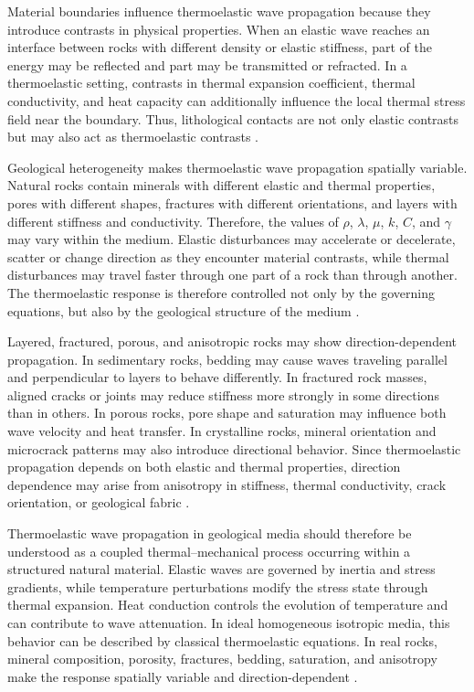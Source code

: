 Material boundaries influence thermoelastic wave propagation because they introduce contrasts in physical properties. When an elastic wave reaches an interface between rocks with different density or elastic stiffness, part of the energy may be reflected and part may be transmitted or refracted. In a thermoelastic setting, contrasts in thermal expansion coefficient, thermal conductivity, and heat capacity can additionally influence the local thermal stress field near the boundary. Thus, lithological contacts are not only elastic contrasts but may also act as thermoelastic contrasts \cite{aki2002,mavko2009,robertson1988}.

Geological heterogeneity makes thermoelastic wave propagation spatially variable. Natural rocks contain minerals with different elastic and thermal properties, pores with different shapes, fractures with different orientations, and layers with different stiffness and conductivity. Therefore, the values of \(\rho\), \(\lambda\), \(\mu\), \(k\), \(C\), and \(\gamma\) may vary within the medium. Elastic disturbances may accelerate or decelerate, scatter or change direction as they encounter material contrasts, while thermal disturbances may travel faster through one part of a rock than through another. The thermoelastic response is therefore controlled not only by the governing equations, but also by the geological structure of the medium \cite{mavko2009,jaeger2007,robertson1988}.

Layered, fractured, porous, and anisotropic rocks may show direction-dependent propagation. In sedimentary rocks, bedding may cause waves traveling parallel and perpendicular to layers to behave differently. In fractured rock masses, aligned cracks or joints may reduce stiffness more strongly in some directions than in others. In porous rocks, pore shape and saturation may influence both wave velocity and heat transfer. In crystalline rocks, mineral orientation and microcrack patterns may also introduce directional behavior. Since thermoelastic propagation depends on both elastic and thermal properties, direction dependence may arise from anisotropy in stiffness, thermal conductivity, crack orientation, or geological fabric \cite{mavko2009,jaeger2007,aki2002}.

Thermoelastic wave propagation in geological media should therefore be understood as a coupled thermal--mechanical process occurring within a structured natural material. Elastic waves are governed by inertia and stress gradients, while temperature perturbations modify the stress state through thermal expansion. Heat conduction controls the evolution of temperature and can contribute to wave attenuation. In ideal homogeneous isotropic media, this behavior can be described by classical thermoelastic equations. In real rocks, mineral composition, porosity, fractures, bedding, saturation, and anisotropy make the response spatially variable and direction-dependent \cite{nowacki1986,boley1960,mavko2009,turcotte2014}.